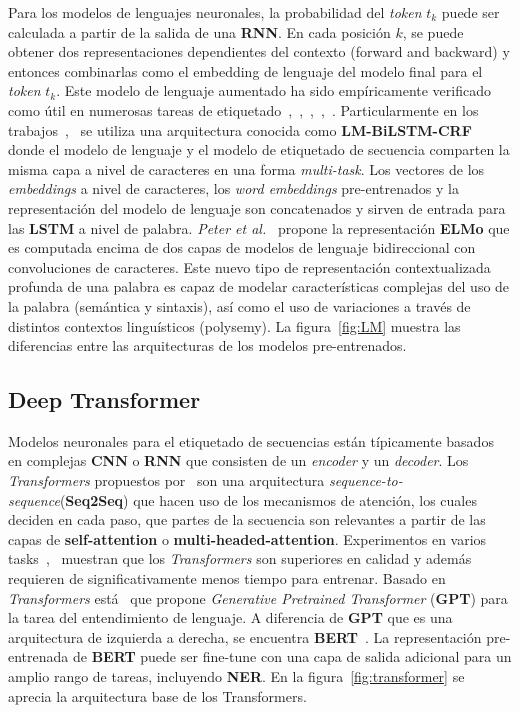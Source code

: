Para los modelos de lenguajes neuronales, la probabilidad del \emph{token} $t_k$ puede ser calculada a partir de la salida de una \textbf{RNN}. En cada posici\'on $k$, se puede obtener dos representaciones dependientes del contexto (forward and backward) y entonces combinarlas como el embedding de lenguaje del modelo final para el \emph{token} $t_k$. Este modelo de lenguaje aumentado ha sido emp\'iricamente verificado como \'util en numerosas tareas de etiquetado~\cite{peters2017semi},~\cite{peters2018deep},~\cite{rei2017semi},~\cite{liu2018efficient},~\cite{liu2018empower}. Particularmente en los trabajos~\cite{liu2018efficient},~\cite{liu2018empower} se utiliza una arquitectura conocida como \textbf{LM-BiLSTM-CRF} donde el modelo de lenguaje y el modelo de etiquetado de secuencia comparten la misma capa a nivel de caracteres en una forma \emph{multi-task}. Los vectores de los \emph{embeddings} a nivel de caracteres, los \emph{word embeddings} pre-entrenados y la representaci\'on del modelo de lenguaje son concatenados y sirven de entrada para las \textbf{LSTM} a nivel de palabra. \emph{Peter et al.}~\cite{peters2018deep} propone la representaci\'on \textbf{ELMo} que es computada encima de dos capas de modelos de lenguaje bidireccional con convoluciones de caracteres. Este nuevo tipo de representaci\'on contextualizada profunda de una palabra es capaz de modelar caracter\'isticas complejas del uso de la palabra (sem\'antica y sintaxis), as\'i como el uso de variaciones a trav\'es de distintos contextos lingu\'isticos (polysemy). La figura~\ref{fig:LM} muestra las diferencias entre las arquitecturas de los modelos pre-entrenados.

\subsection{Deep Transformer}

Modelos neuronales para el etiquetado de secuencias est\'an t\'ipicamente basados en complejas \textbf{CNN} o \textbf{RNN} que consisten de un \emph{encoder} y un \emph{decoder}. Los \emph{Transformers} propuestos por~\cite{vaswani2017attention} son una arquitectura \emph{sequence-to-sequence}(\textbf{Seq2Seq}) que hacen uso de los mecanismos de atenci\'on, los cuales deciden en cada paso, que partes de la secuencia son relevantes a partir de las capas de \textbf{self-attention} o \textbf{multi-headed-attention}. Experimentos en varios tasks~\cite{kitaev2018constituency},~\cite{liu2018generating} muestran que los \emph{Transformers} son superiores en calidad y adem\'as requieren de significativamente menos tiempo para entrenar. Basado en \emph{Transformers} est\'a~\cite{radford2018improving} que propone \emph{Generative Pretrained Transformer} (\textbf{GPT}) para la tarea del entendimiento de lenguaje. A diferencia de \textbf{GPT} que es una arquitectura de izquierda a derecha, se encuentra \textbf{BERT}~\cite{devlin2018bert}. La representaci\'on pre-entrenada de \textbf{BERT} puede ser fine-tune con una capa de salida adicional para un amplio rango de tareas, incluyendo \textbf{NER}. En la figura~\ref{fig:transformer} se aprecia la arquitectura base de los Transformers.

